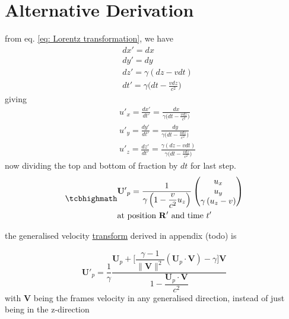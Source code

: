 \section{Alternative Derivation}
from eq. \eqref{eq: Lorentz transformation}, we have
\begin{equation}%
    \begin{aligned}
      &  dx'=dx \\ & dy'=dy \\ &dz' = \gamma (dz-vdt)  \\ 
      & dt'=\gamma \bigg(dt-\frac{vdz}{c^2}\bigg) 
    \end{aligned}
\end{equation}%
giving 
\begin{equation}%
    \begin{aligned}
      & u'_x = \frac{dx'}{dt'}=\frac{dx}{\gamma \bigg(dt-\frac{vdz}{c^2}\bigg) } \\ & u'_y = \frac{dy'}{dt'}=\frac{dy}{\gamma \bigg(dt-\frac{vdz}{c^2}\bigg) }\\ & u'_z = \frac{dz'}{dt'} = \frac{\gamma (dz-vdt)}{\gamma \bigg(dt-\frac{vdz}{c^2}\bigg) } 
    \end{aligned}
\end{equation}%
now dividing the top and bottom of fraction by $dt$ for last step.
\begin{equation}%
\mhl{
\begin{aligned}
     &\mathbf{U'}_p = \dfrac{1}{\gamma\left(1- \dfrac{v}{c^2} u_z\right) }\begin{pmatrix}
    u_x \\ u_y  \\ \gamma \left( u_z  - v  \right) \\
    \end{pmatrix}  \\
    &\text{at position $\mathbf{R'}$ and time $t'$ } 
\end{aligned}      
    }
\end{equation}%

the generalised velocity \hyperlink{def-transform}{transform} derived in appendix (todo) is

\begin{equation}
    \mathbf{U'}_p  = \dfrac{1}{\gamma} \dfrac{\mathbf{U}_p + \Big[\dfrac{\gamma-1}{\|\mathbf{V}\|^2}(\mathbf{U}_p\cdot \mathbf{V})- \gamma \Big] \mathbf{V}}{1 - \dfrac{\mathbf{U}_p\cdot\mathbf{V}}{c^2}}
\end{equation}
with $\mathbf{V}$ being the frames velocity in any generalised direction, instead of just being in the z-direction



